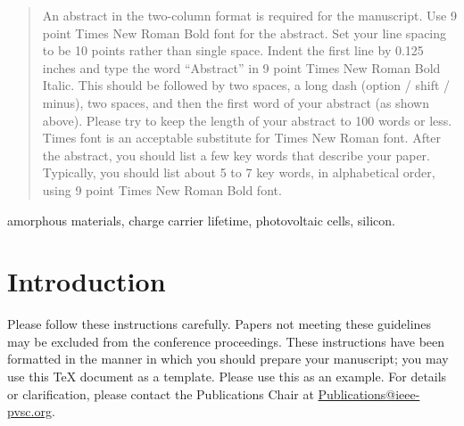 \documentclass[conference]{./pvsctran}
\begin{document}

\setlength{\columnsep}{0.25in}


\maketitle


\begin{abstract}
An abstract in the two-column format is required for the manuscript. Use 9 point Times New Roman Bold font for the abstract. Set your line spacing to be 10 points rather than single space. Indent the first line by 0.125 inches and type the word ``Abstract'' in 9 point Times New Roman Bold Italic. This should be followed by two spaces, a long dash (option / shift / minus), two spaces, and then the first word of your abstract (as shown above). Please try to keep the length of your abstract to 100 words or less. Times font is an acceptable substitute for Times New Roman font. After the abstract, you should list a few key words that describe your paper. Typically, you should list about 5 to 7 key words, in alphabetical order, using 9 point Times New Roman Bold font.
\end{abstract}
\begin{IEEEkeywords}
amorphous materials, charge carrier lifetime, photovoltaic cells, silicon.
\end{IEEEkeywords}




%
\IEEEpeerreviewmaketitle



\section{Introduction}
Please follow these instructions carefully.  Papers not meeting these guidelines may be excluded from the conference proceedings.  These instructions have been formatted in the manner in which you should prepare your manuscript; you may use this TeX document as a template.  Please use this as an example.  For details or clarification, please contact the Publications Chair at \url{Publications@ieee-pvsc.org}. 
\end{document}
